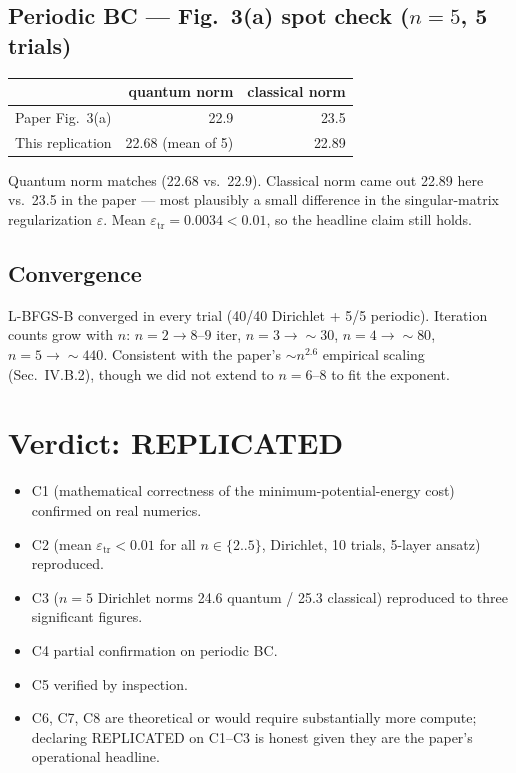 \documentclass[11pt]{article}
\begin{document}
\subsection{Periodic BC --- Fig.~3(a) spot check ($n=5$, 5 trials)}
\begin{center}
\begin{tabular}{@{}lrr@{}}
\toprule
 & quantum norm & classical norm \\
\midrule
Paper Fig.~3(a)   & 22.9  & 23.5 \\
This replication  & 22.68 (mean of 5) & 22.89 \\
\bottomrule
\end{tabular}
\end{center}
Quantum norm matches (22.68 vs.\ 22.9). Classical norm came out 22.89 here vs.\ 23.5
in the paper --- most plausibly a small difference in the singular-matrix
regularization $\varepsilon$. Mean $\varepsilon_{\text{tr}} = 0.0034 < 0.01$, so the
headline claim still holds.

\subsection{Convergence}
L-BFGS-B converged in every trial (40/40 Dirichlet + 5/5 periodic). Iteration counts
grow with $n$: $n=2 \to 8\text{--}9$ iter, $n=3 \to \sim 30$, $n=4 \to \sim 80$,
$n=5 \to \sim 440$. Consistent with the paper's $\sim n^{2.6}$ empirical scaling
(Sec.~IV.B.2), though we did not extend to $n=6\text{--}8$ to fit the exponent.

\section{Verdict: REPLICATED}
\begin{itemize}
\item C1 (mathematical correctness of the minimum-potential-energy cost) confirmed on
real numerics.
\item C2 (mean $\varepsilon_{\text{tr}} < 0.01$ for all $n\in\{2..5\}$, Dirichlet,
10 trials, 5-layer ansatz) reproduced.
\item C3 ($n=5$ Dirichlet norms 24.6 quantum / 25.3 classical) reproduced to three
significant figures.
\item C4 partial confirmation on periodic BC.
\item C5 verified by inspection.
\item C6, C7, C8 are theoretical or would require substantially more compute; declaring
REPLICATED on C1--C3 is honest given they are the paper's operational headline.
\end{itemize}
\end{document}
